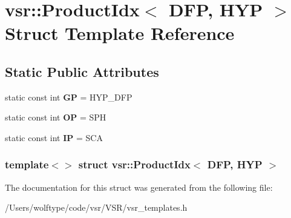 \hypertarget{structvsr_1_1_product_idx_3_01_d_f_p_00_01_h_y_p_01_4}{\section{vsr\-:\-:Product\-Idx$<$ D\-F\-P, H\-Y\-P $>$ Struct Template Reference}
\label{structvsr_1_1_product_idx_3_01_d_f_p_00_01_h_y_p_01_4}
}
\subsection*{Static Public Attributes}
\begin{DoxyCompactItemize}
\item 
\hypertarget{structvsr_1_1_product_idx_3_01_d_f_p_00_01_h_y_p_01_4_af733f678863099ad9715a411327c01e2}{static const int {\bfseries G\-P} = H\-Y\-P\-\_\-\-D\-F\-P}\label{structvsr_1_1_product_idx_3_01_d_f_p_00_01_h_y_p_01_4_af733f678863099ad9715a411327c01e2}

\item 
\hypertarget{structvsr_1_1_product_idx_3_01_d_f_p_00_01_h_y_p_01_4_af1a58db60d25f1df033d5c95bf874725}{static const int {\bfseries O\-P} = S\-P\-H}\label{structvsr_1_1_product_idx_3_01_d_f_p_00_01_h_y_p_01_4_af1a58db60d25f1df033d5c95bf874725}

\item 
\hypertarget{structvsr_1_1_product_idx_3_01_d_f_p_00_01_h_y_p_01_4_abdc69d11997fcc5039154c3303e79864}{static const int {\bfseries I\-P} = S\-C\-A}\label{structvsr_1_1_product_idx_3_01_d_f_p_00_01_h_y_p_01_4_abdc69d11997fcc5039154c3303e79864}

\end{DoxyCompactItemize}
\subsubsection*{template$<$$>$ struct vsr\-::\-Product\-Idx$<$ D\-F\-P, H\-Y\-P $>$}



The documentation for this struct was generated from the following file\-:\begin{DoxyCompactItemize}
\item 
/\-Users/wolftype/code/vsr/\-V\-S\-R/vsr\-\_\-templates.\-h\end{DoxyCompactItemize}
